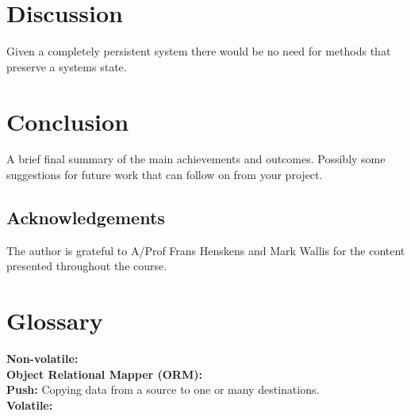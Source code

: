 \documentclass[a4paper,12pt]{article}
\begin{document}
\section{Discussion}\label{sec:discussion}
Given a completely persistent system there would be no need for methods that preserve a systems state.
%
\section{Conclusion}
%
A brief final summary of the main achievements and outcomes. Possibly some suggestions for future work that can follow on from your project.%
%
\subsection*{Acknowledgements}
The author is grateful to A/Prof Frans Henskens and Mark Wallis for the content presented throughout the course.
\newpage
\section{Glossary}
\textbf{Non-volatile:}
\\\textbf{Object Relational Mapper (ORM):} 
\\\textbf{Push:} Copying data from a source to one or many destinations. 
\\\textbf{Volatile:}
%

\vskip 0.2in
\newpage


\end{document}
